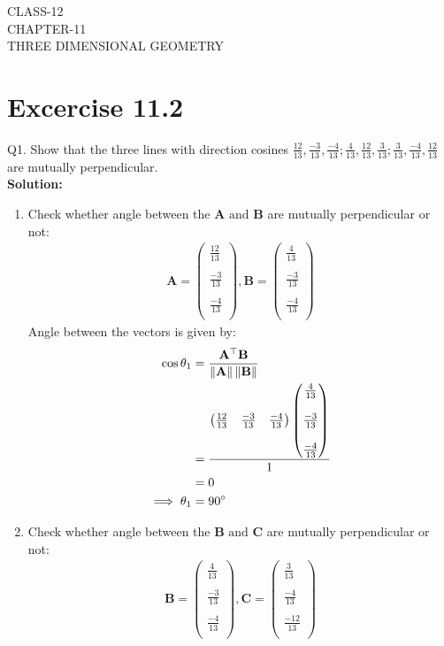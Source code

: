 \documentclass[12pt]{article}
\providecommand{\norm}[1]{\left\lVert#1\right\rVert}
\newcommand{\solution}{\noindent \textbf{Solution: }}
\newcommand{\myvec}[1]{\ensuremath{\begin{pmatrix}#1\end{pmatrix}}}
\let\vec\mathbf
\begin{document}
\begin{center}
\textbf\large{CLASS-12 \\ CHAPTER-11 \\ THREE DIMENSIONAL GEOMETRY}
\end{center}
\section*{Excercise 11.2}

Q1. Show that the three lines with direction cosines $\frac{12}{13}, \frac{-3}{13}, \frac{-4}{13}; \frac{4}{13}, \frac{12}{13}, \frac{3}{13}; \frac{3}{13}, \frac{-4}{13}, \frac{12}{13}$ are mutually perpendicular.
\\
\solution
\begin{enumerate}
\item Check whether angle between the $\vec{A} \text{ and } \vec{B}$ are mutually perpendicular or not:
		\begin{align}
		\vec{A}=\myvec{\frac{12}{13}\\\\\frac{-3}{13}\\\\\frac{-4}{13}\\},\vec{B}=\myvec{\frac{4}{13}\\\\\frac{-3}{13}\\\\\frac{-4}{13}\\}
		\end{align}
	Angle between the vectors is given by:
		\begin{align}
			\cos\theta_1&=\frac{\vec{A}^\top\vec{B}}{\norm{\vec{A}}\norm{\vec{B}}}\\
			&=\frac{\myvec{\frac{12}{13}&\frac{-3}{13}&\frac{-4}{13}}\myvec{\frac{4}{13}\\\\\frac{-3}{13}\\\\\frac{-4}{13}\\}}{1}\\
			&=0\\
			\implies \theta_1&=90\degree
		\end{align}
	\item Check whether angle between the $\vec{B} \text{ and } \vec{C}$ are mutually perpendicular or not:
                  \begin{align}
  \vec{B}=\myvec{\frac{4}{13}\\\\\frac{-3}{13}\\\\\frac{-4}{13}\\},\vec{C}=\myvec{\frac{3}{13}\\\\\frac{-4}{13}\\\\\frac{-12}{13}\\}

\end{align}
\end{enumerate}
\end{document}

